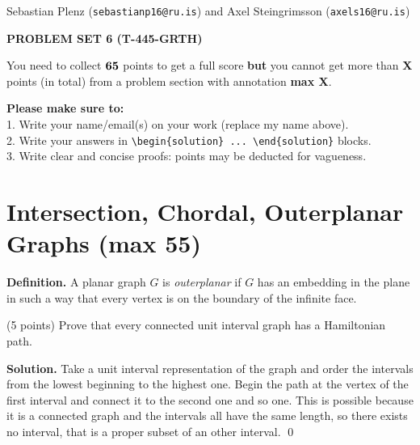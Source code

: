 \documentclass[a4paper,11pt]{amsart}
\newcounter{temp}
\newcounter{prob_counter}
\newenvironment{problem}
{\begin{list}{{\bf \arabic{prob_counter}}}{
      \usecounter{prob_counter}
      \addtolength{\labelsep}{.6ex}
      \addtolength{\itemsep}{4.3ex}
      \setlength{\leftmargin}{1.4em}}
      \setcounter{prob_counter}{\value{temp}}
}
{\setcounter{temp}{\value{prob_counter}}  
  \end{list}
}
\newenvironment{solution}{\textbf{Solution.}}{\qed}
\newcommand{\rubrik}[1]{\bigskip \begin{center}{\bf #1}\end{center} \medskip}
\begin{document}
\pagestyle{empty}
\thispagestyle{empty}

{\small{\sc\noindent
        Sebastian Plenz ({\tt sebastianp16@ru.is}) and Axel Steingrimsson ({\tt axels16@ru.is})
}}

\rubrik{PROBLEM SET 6 (T-445-GRTH)}

You need to collect $\bf 65$ points to get a full score {\bf but} you cannot get more than {\bf X} points (in total) from a problem section with annotation {\bf max X}.

{\bf Please make sure to:}\\
1. Write your name/email(s) on your work (replace my name above).\\
2. Write your answers in \texttt{{\textbackslash}begin\{solution\} ... {\textbackslash}end\{solution\}} blocks.\\
3. Write clear and concise proofs: points may be deducted for vagueness.




\section{Intersection, Chordal, Outerplanar Graphs ({\bf max 55})}

{\bf Definition.} A planar graph $G$ is \emph{outerplanar} if $G$ has an embedding in the plane in such a way that every vertex is on the boundary of the infinite face.

\begin{problem}
 \item (5 points) Prove that every connected unit interval graph has a Hamiltonian path.
\end{problem}
\begin{solution}
	Take a unit interval representation of the graph and order the intervals from the lowest beginning to the highest one. Begin the path at the vertex of the first interval and connect it to the second one and so one. This is possible because it is a connected graph and the intervals all have the same length, so there exists no interval, that is a proper subset of an other interval.
\end{solution}
\end{document}
